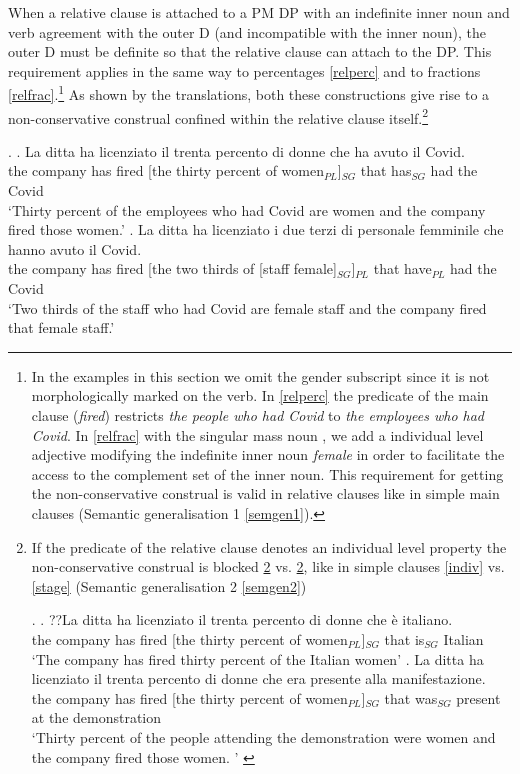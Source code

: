 \documentclass[charis, linguex]{glossa}
\begin{document}
When a relative clause is attached to a PM DP with an indefinite inner noun and verb agreement with the outer D (and incompatible with the inner noun), the outer D must be definite so that the relative clause can attach to the DP. This requirement applies in the same way to percentages \ref{relperc} and to fractions \ref{relfrac}.\footnote{In the examples in this section we omit the gender subscript since it is not morphologically marked on the verb. In \ref{relperc} the predicate of the main clause (\textit{fired}) restricts \textit{the people who had Covid} to \textit{the employees who had Covid}. In \ref{relfrac} with the singular mass noun , we add a individual level adjective modifying the indefinite inner noun \textit{female} in order to facilitate the access to the complement set of the inner noun. This  requirement for getting the non-conservative construal is valid in relative clauses like in simple main clauses (Semantic generalisation 1 \ref{semgen1}).} As shown by the translations, both these constructions give rise to a non-conservative construal confined within the relative clause itself.\footnote{If the predicate of the relative clause denotes an individual level property the non-conservative construal is blocked \ref{idivid} vs. \ref{stagel}, like in simple clauses \ref{indiv} vs. \ref{stage} (Semantic generalisation 2 \ref{semgen2})

\ex. \ag. ??La ditta ha licenziato il trenta percento di donne che è italiano. \\ 
           the company has fired [the thirty percent of women$_{PL}$]$_{SG}$              that is$_{SG}$ Italian  \\
         \glt `The company has fired thirty percent of the Italian women' \label{idivid}
        \bg. La ditta ha licenziato il trenta percento di donne che era       		presente alla manifestazione. \\ 
	the company has fired [the thirty percent of women$_{PL}$]$_{SG}$ that 		was$_{SG}$ present {at the} demonstration \\
	\glt `Thirty percent of the people attending the demonstration were women 	and the company fired those women. ' \label{stagel}
		
		}


\ex. \label{order}  \ag. La ditta ha licenziato il trenta percento di donne che ha avuto il Covid.\\ 
	  the company has fired [the thirty percent of women$_{PL}$]$_{SG}$ that has$_{SG}$ had the Covid\\
	\glt  `Thirty percent of the employees who had Covid are women and the company fired those women.' \label{relperc} 
\bg. La ditta ha licenziato i due terzi di personale femminile che hanno avuto il Covid. \\
   	the company has fired [the two thirds of [staff female]$_{SG}$]$_{PL}$ that have$_{PL}$ had the Covid \\ 
   	\glt `Two thirds of the staff who had Covid are female staff and the company fired that female staff.'
   \label{relfrac} 
\end{document}
